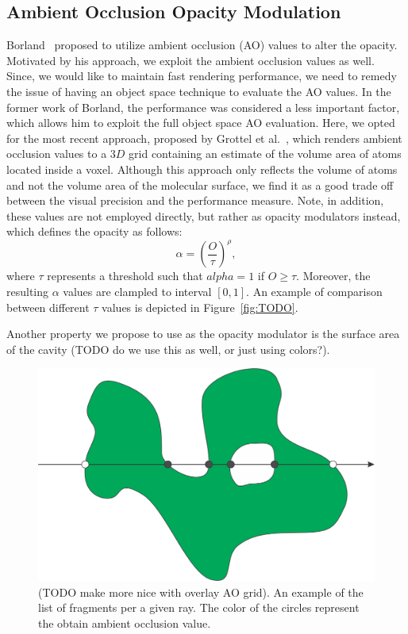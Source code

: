 \subsection{Ambient Occlusion Opacity Modulation}
Borland~\cite{borland2011ambient} proposed to utilize ambient occlusion (AO) values to alter the opacity. Motivated by his approach, we exploit the ambient occlusion values as well. Since, we would like to maintain fast rendering performance, we need to remedy the issue of having an object space technique to evaluate the AO values. In the former work of Borland, the performance was considered a less important factor, which allows him to exploit the full object space AO evaluation. Here, we opted for the most recent approach, proposed by Grottel et al.~\cite{grottel2012object}, which renders ambient occlusion values to a $3D$ grid containing an estimate of the volume area of atoms located inside a voxel. Although this approach only reflects the volume of atoms and not the volume area of the molecular surface, we find it as a good trade off between the visual precision and the performance measure. Note, in addition, these values are not employed directly, but rather as opacity modulators instead, which defines the opacity as follows:
\begin{equation}
  \alpha = \left( \frac{O}{\tau}\right)^\rho,
	\label{eq:alpha}
\end{equation}
where $\tau$ represents a threshold such that $alpha=1$ if $O\geq\tau$. Moreover, the resulting $\alpha$ values are clampled to interval $[0,1]$. An example of comparison between different $\tau$ values is depicted in Figure~\ref{fig:TODO}.

Another property we propose to use as the opacity modulator is the surface area of the cavity (TODO do we use this as well, or just using colors?).
\begin{figure}[htb]
\centering
  \includegraphics[width=0.8\columnwidth]{image/ray_fragments.png}
  \caption{(TODO make more nice with overlay AO grid). An example of the list of fragments per a given ray. The color of the circles represent the obtain ambient occlusion value.}
	\label{fig:ray_fragments}
\end{figure}

